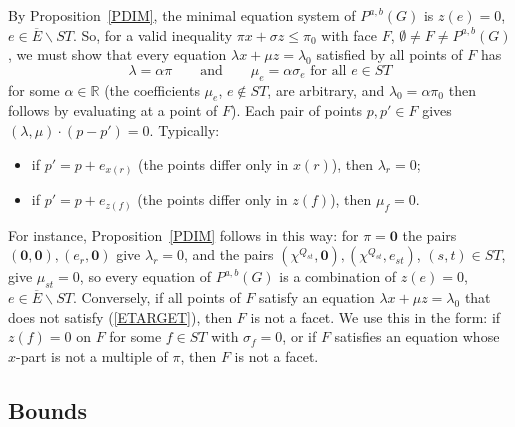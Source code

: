 \documentclass[a4paper,11pt]{article}
\newcommand{\Eb}{\overline{E}}
\theoremstyle{definition}
\begin{document}
By Proposition~\ref{PDIM}, the minimal equation system of $P^{a,b}(G)$ is $z(e) = 0$, $e \in \Eb \backslash ST$. So, for a valid inequality
$\pi x + \sigma z \leq \pi_0$ with face $F$, $\emptyset \neq F \neq P^{a,b}(G)$, we must show that every equation $\lambda x + \mu z = \lambda_0$
satisfied by all points of $F$ has
\begin{equation} \label{ETARGET}
\lambda = \alpha \pi \qquad \textrm{and} \qquad \mu_e = \alpha \sigma_e \textrm{ for all } e \in ST
\end{equation}
for some $\alpha \in \mathbb{R}$ (the coefficients $\mu_e$, $e \notin ST$, are arbitrary, and $\lambda_0 = \alpha\pi_0$ then follows by evaluating
at a point of $F$). Each pair of points $p, p' \in F$ gives $(\lambda, \mu) \cdot (p - p') = 0$. Typically:
\begin{itemize}
\item if $p' = p + e_{x(r)}$ (the points differ only in $x(r)$), then $\lambda_r = 0$;
\item if $p' = p + e_{z(f)}$ (the points differ only in $z(f)$), then $\mu_f = 0$.
\end{itemize}
For instance, Proposition~\ref{PDIM} follows in this way: for $\pi = \mathbf{0}$ the pairs $(\mathbf{0},\mathbf{0}), (e_r,\mathbf{0})$ give $\lambda_r = 0$, and
the pairs $(\chi^{Q_{st}}, \mathbf{0}), (\chi^{Q_{st}}, e_{st})$, $(s,t) \in ST$, give $\mu_{st} = 0$, so every equation of $P^{a,b}(G)$ is a combination of
$z(e) = 0$, $e \in \Eb \backslash ST$.
Conversely, if all points of $F$ satisfy an equation $\lambda x + \mu z = \lambda_0$ that does not satisfy (\ref{ETARGET}), then $F$ is not
a facet. We use this in the form: if $z(f) = 0$ on $F$ for some $f \in ST$ with $\sigma_f = 0$, or if $F$ satisfies an equation
whose $x$-part is not a multiple of $\pi$, then $F$ is not a facet.

\subsection{Bounds}
\end{document}
